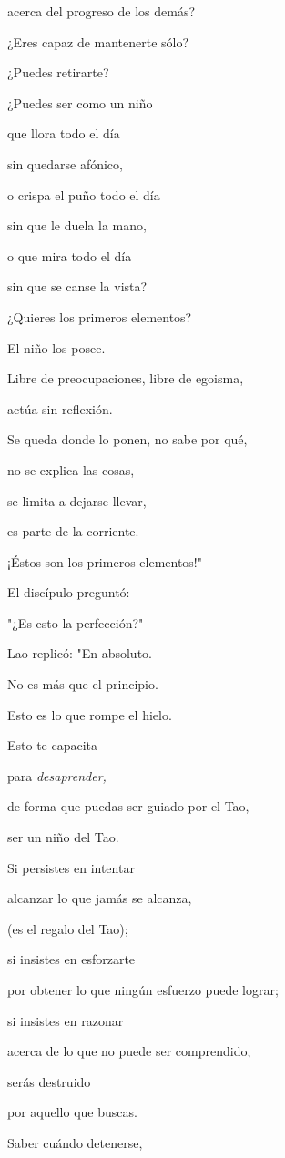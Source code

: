 acerca del progreso de los demás?

¿Eres capaz de mantenerte sólo?

¿Puedes retirarte?

¿Puedes ser como un niño

que llora todo el día

sin quedarse afónico,

o crispa el puño todo el día

sin que le duela la mano,

o que mira todo el día

sin que se canse la vista?

¿Quieres los primeros elementos?

El niño los posee.

Libre de preocupaciones, libre de egoisma,

actúa sin reflexión.

Se queda donde lo ponen, no sabe por qué,

no se explica las cosas,

se limita a dejarse llevar,

es parte de la corriente.

¡Éstos son los primeros elementos!"

El discípulo preguntó:

"¿Es esto la perfección?"

Lao replicó: "En absoluto.

No es más que el principio.

Esto es lo que rompe el hielo.

Esto te capacita

para \emph{desaprender,}

de forma que puedas ser guiado por el Tao,

ser un niño del Tao.

Si persistes en intentar

alcanzar lo que jamás se alcanza,

(es el regalo del Tao);

si insistes en esforzarte

por obtener lo que ningún esfuerzo puede lograr;

si insistes en razonar

acerca de lo que no puede ser comprendido,

serás destruido

por aquello que buscas.

Saber cuándo detenerse,


